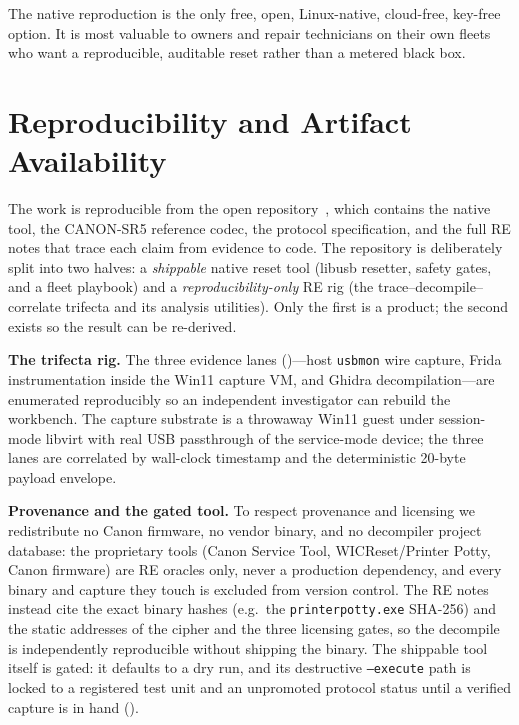 \documentclass[conference]{IEEEtran}
\begin{document}
The native reproduction is the only free, open, Linux-native, cloud-free,
key-free option. It is most valuable to owners and repair technicians on
their own fleets who want a reproducible, auditable reset rather than a
metered black box.

\section{Reproducibility and Artifact Availability}
\label{sec:artifact}

The work is reproducible from the open repository~\cite{canon-megatank-reset},
which contains the native tool, the CANON-SR5 reference codec, the
protocol specification, and the full RE notes that trace each claim from
evidence to code. The repository is deliberately split into two halves: a
\emph{shippable} native reset tool (libusb resetter, safety gates, and a
fleet playbook) and a \emph{reproducibility-only} RE rig (the
trace--decompile--correlate trifecta and its analysis utilities). Only the
first is a product; the second exists so the result can be re-derived.

\textbf{The trifecta rig.} The three evidence lanes
()---host \texttt{usbmon} wire capture, Frida
instrumentation inside the Win11 capture VM, and Ghidra decompilation---are
enumerated reproducibly so an independent investigator can rebuild the
workbench. The capture substrate is a throwaway Win11 guest under
session-mode libvirt with real USB passthrough of the service-mode device;
the three lanes are correlated by wall-clock timestamp and the
deterministic 20-byte payload envelope.

\textbf{Provenance and the gated tool.} To respect provenance and
licensing we redistribute no Canon firmware, no vendor binary, and no
decompiler project database: the proprietary tools (Canon Service Tool,
WICReset/Printer Potty, Canon firmware) are RE oracles only, never a
production dependency, and every binary and capture they touch is excluded
from version control. The RE notes instead cite the exact binary hashes
(e.g.\ the \texttt{printerpotty.exe} SHA-256) and the static addresses of
the cipher and the three licensing gates, so the decompile is independently
reproducible without shipping the binary. The shippable tool itself is
gated: it defaults to a dry run, and its destructive \texttt{--execute}
path is locked to a registered test unit and an unpromoted protocol status
until a verified capture is in hand ().
\end{document}
